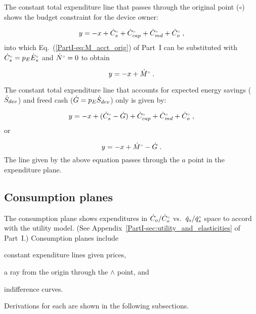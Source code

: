 The constant total expenditure line 
that passes through the original point ($\circ$)
shows the budget constraint for the device owner:

\begin{equation}
  y = -x + {}{\dot{C}}^{\scriptscriptstyle \circ}_s + {}{\dot{C}}^{\scriptscriptstyle \circ}_{cap} + {}{\dot{C}}^{\scriptscriptstyle \circ}_{md} + {}{\dot{C}}^{\scriptscriptstyle \circ}_o \; ,
\end{equation}
%
into which Eq.~(\ref{PartI-eq:M_acct_orig}) of Part~I can be substituted with 
${}{\dot{C}}^{\scriptscriptstyle \circ}_s = p_E {}{\dot{E}}^{\scriptscriptstyle \circ}_s$ and 
${}{\dot{N}}^{\scriptscriptstyle \circ} = 0$ to obtain

\begin{equation}
  y = -x + {}{\dot{M}}^{\scriptscriptstyle \circ} \; .
\end{equation}

The constant total expenditure line 
that accounts for expected energy savings ($\dot{S}_{dev}$) 
and freed cash ($\dot{G} = p_E \dot{S}_{dev}$) only 
is given by:

\begin{equation}
  y = -x + ({}{\dot{C}}^{\scriptscriptstyle \circ}_s - \dot{G}) + {}{\dot{C}}^{\scriptscriptstyle \circ}_{cap} + {}{\dot{C}}^{\scriptscriptstyle \circ}_{md} + {}{\dot{C}}^{\scriptscriptstyle \circ}_o \; ,
\end{equation}
%
or

\begin{equation}
  y = -x + {}{\dot{M}}^{\scriptscriptstyle \circ} - \dot{G}\; .
\end{equation}
%
The line given by the above equation
passes through the $a$ point in the expenditure plane.


\subsection{Consumption planes}
\label{sec:cons_path_graph_details}

The consumption plane shows expenditures in 
$\dot{C}_o/{}{\dot{C}}^{\scriptscriptstyle \circ}_o$ vs.\ $\dot{q}_s/{}{\dot{q}}^{\scriptscriptstyle \circ}_s$ space
to accord with the utility model.
(See Appendix~\ref{PartI-sec:utility_and_elasticities} of Part~I.)
Consumption planes include 
%
\begin{enumerate*}[label={(\roman*)}]
	
  \item constant expenditure lines given prices,
  
  \item a ray from the origin through the $\wedge$ point, and 
  
  \item indifference curves.
    
\end{enumerate*}
%
Derivations for each are shown in the following subsections.


